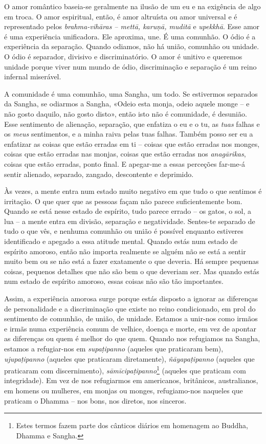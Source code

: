 O amor romântico baseia-se geralmente na ilusão de um eu e na exigência de algo
em troca. O amor espiritual, então, é amor altruísta ou amor universal e é
representado pelos \emph{brahma-vihāras -- mettā, karuṇā, muditā} e
\emph{upekkhā}. Esse amor é uma experiência unificadora. Ele aproxima, une. É
uma comunhão. O ódio é a experiência da separação. Quando odiamos, não há união,
comunhão ou unidade. O ódio é separador, divisivo e discriminatório. O amor é
unitivo e queremos unidade porque viver num mundo de ódio, discriminação e
separação é um reino infernal miserável.

A comunidade é uma comunhão, uma Sangha, um todo. Se estivermos separados da
Sangha, se odiarmos a Sangha, «Odeio esta monja, odeio aquele monge -- e não
gosto daquilo, não gosto disto», então isto não é comunidade, é desunião. Esse
sentimento de alienação, separação, que enfatiza o eu e o tu, as \emph{tuas}
falhas e os \emph{meus} sentimentos, e a minha raiva pelas tuas falhas. Também
posso ser eu a enfatizar as coisas que estão erradas em ti -- coisas que estão
erradas nos monges, coisas que estão erradas nas monjas, coisas que estão
erradas nos \emph{anagārikas}, coisas que estão erradas, ponto final. E apegar-me a
essas perceções far-me-á sentir alienado, separado, zangado, descontente e
deprimido.

Às vezes, a mente entra num estado muito negativo em que tudo o que sentimos é
irritação. O que quer que as pessoas façam não parece suficientemente bom.
Quando se está nesse estado de espírito, tudo parece errado -- os gatos, o sol,
a lua -- a mente entra em divisão, separação e negatividade. Sentes-te separado
de tudo o que vês, e nenhuma comunhão ou união é possível enquanto estiveres
identificado e apegado a essa atitude mental. Quando estás num estado de
espírito amoroso, então não importa realmente se alguém não se está a sentir
muito bem ou se não está a fazer exatamente o que deveria. Há sempre pequenas
coisas, pequenos detalhes que não são bem o que deveriam ser. Mas quando estás
num estado de espírito amoroso, essas coisas não são tão importantes.

Assim, a experiência amorosa surge porque estás disposto a ignorar as diferenças
de personalidade e a discriminação que existe no reino condicionado, em prol do
sentimento de comunhão, de união, de unidade. Estamos a unir-nos como irmãos e
irmãs numa experiência comum de velhice, doença e morte, em vez de apontar as
diferenças ou quem é melhor do que quem. Quando nos refugiamos na Sangha,
estamos a refugiar-nos em \emph{supaṭipanno} (aqueles que praticaram bem),
\emph{ujupaṭipanno} (aqueles que praticaram diretamente), \emph{ñāyapaṭipanno}
(aqueles que praticaram com discernimento),
\emph{sāmīcipaṭipanno}\footnote{Estes termos fazem parte dos cânticos diários em
  homenagem ao Buddha, Dhamma e Sangha.} (aqueles que praticam com integridade).
Em vez de nos refugiarmos em americanos, britânicos, australianos, em homens ou
mulheres, em monjas ou monges, refugiamo-nos naqueles que praticam o Dhamma --
nos bons, nos diretos, nos sinceros.

